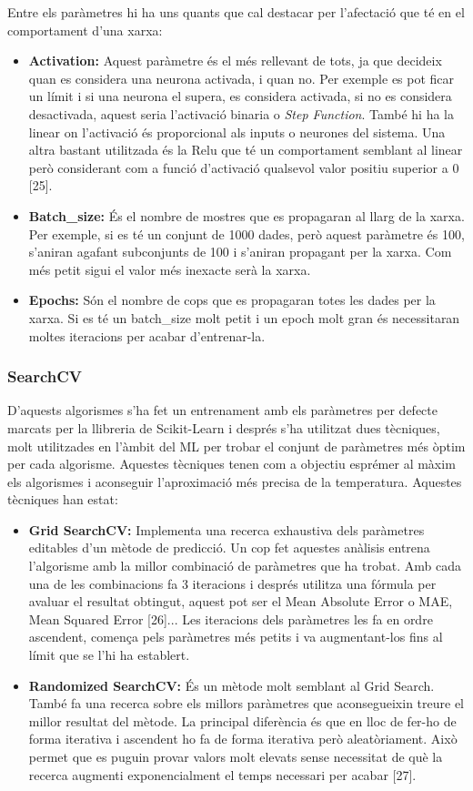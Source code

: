 \documentclass[10pt,a4paper,twocolumn,twoside]{article}
\begin{document}
Entre els paràmetres hi ha uns quants que cal destacar per l'afectació que té en el comportament d'una xarxa:
\begin{itemize}
\item \textbf{Activation:} Aquest paràmetre és el més rellevant de tots, ja que decideix quan es considera una neurona activada, i quan no. Per exemple es pot ficar un límit i si una neurona el supera, es considera activada, si no es considera desactivada, aquest seria l'activació binaria o \textit{Step Function}. També hi ha la linear on l'activació és proporcional als inputs o neurones del sistema. Una altra bastant utilitzada és la Relu que té un comportament semblant al linear però considerant com a funció d'activació qualsevol valor positiu superior a 0 [25].
\item \textbf{Batch\_size:} És el nombre de mostres que es propagaran al llarg de la xarxa. Per exemple, si es té un conjunt de 1000 dades, però aquest paràmetre és 100, s'aniran agafant subconjunts de 100 i s'aniran propagant per la xarxa. Com més petit sigui el valor més inexacte serà la xarxa.
\item \textbf{Epochs:} Són el nombre de cops que es propagaran totes les dades per la xarxa. Si es té un batch\_size molt petit i un epoch molt gran és necessitaran moltes iteracions per acabar d'entrenar-la.
\end{itemize}

\subsubsection{SearchCV}
D'aquests algorismes s'ha fet un entrenament amb els paràmetres per defecte marcats per la llibreria de Scikit-Learn i després s'ha utilitzat dues tècniques, molt utilitzades en l'àmbit del ML per trobar el conjunt de paràmetres més òptim per cada algorisme. Aquestes tècniques tenen com a objectiu esprémer al màxim els algorismes i aconseguir l'aproximació més precisa de la temperatura. Aquestes tècniques han estat:
\begin{itemize}
\item \textbf{Grid SearchCV:} Implementa una recerca exhaustiva dels paràmetres editables d'un mètode de predicció. Un cop fet aquestes anàlisis entrena l'algorisme amb la millor combinació de paràmetres que ha trobat. Amb cada una de les combinacions fa 3 iteracions i després utilitza una fórmula per avaluar el resultat obtingut, aquest pot ser el Mean Absolute Error o MAE, Mean Squared Error [26]... Les iteracions dels paràmetres les fa en ordre ascendent, comença pels paràmetres més petits i va augmentant-los fins al límit que se l'hi ha establert.
\item \textbf{Randomized SearchCV:} És un mètode molt semblant al Grid Search. També fa una recerca sobre els millors paràmetres que aconsegueixin treure el millor resultat del mètode. La principal diferència és que en lloc de fer-ho de forma iterativa i ascendent ho fa de forma iterativa però aleatòriament. Això permet que es puguin provar valors molt elevats sense necessitat de què la recerca augmenti exponencialment el temps necessari per acabar [27].


\end{itemize}
\end{document}
